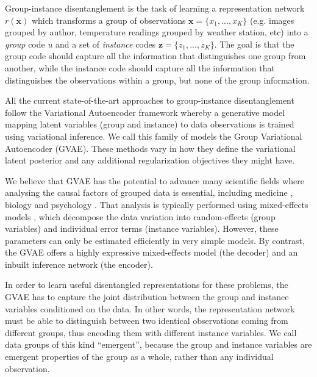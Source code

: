 \documentclass[nohyperref]{article}
\theoremstyle{plain}
\theoremstyle{definition}
\theoremstyle{remark}
\begin{document}
Group-instance disentanglement is the task of learning a representation network $r(\mathbf{x})$ which transforms a group of observations $\mathbf{x} = \{x_1, ..., x_K\}$ (e.g. images grouped by author,  temperature readings grouped by weather station,  etc) into a \textit{group} code $u$ and a set of \textit{instance} codes $\mathbf{z} = \{z_1, ..., z_K\}$. The goal is that the group code should capture all the information that distinguishes one group from another,  while the instance code should capture all the information that distinguishes the observations within a group, but none of the group information.

All the current state-of-the-art approaches to group-instance disentanglement \citep{Bouchacourt2018MultiLevelVA,Hosoya2019GroupbasedLO,Shu2020Weakly, Chen2020WeaklySD,Locatello2020WeaklySupervisedDW} follow the Variational Autoencoder framework \citep{Kingma2014AutoEncodingVB,JimenezRezende2014StochasticBA} whereby a generative model mapping latent variables (group and instance) to data observations is trained using variational inference. We call this family of models the Group Variational Autoencoder (GVAE). These methods vary in how they define the variational latent posterior and any additional regularization objectives they might have.

We believe that GVAE has the potential to advance many scientific fields where analysing the causal factors of grouped data is essential, including medicine \citep{Liang1986LongitudinalDA}, biology \citep{Quinn2002ExperimentalDA} and psychology \citep{Schafer2002MissingDO}. That analysis is typically performed using mixed-effects models \citep{Pinheiro2001MixedEffectsMI}, which decompose the data variation into random-effects (group variables) and individual error terms (instance variables). However, these parameters can only be estimated efficiently in very simple models. By contrast, the GVAE offers a highly expressive mixed-effects model (the decoder) and an inbuilt inference network (the encoder).

In order to learn useful disentangled representations for these problems,  the GVAE has to capture the joint distribution between the group and instance variables conditioned on the data. In other words,  the representation network must be able to distinguish between two identical observations coming from different groups, thus encoding them with different instance variables.  We call data groups of this kind ``emergent'', because the group and instance variables are emergent properties of the group as a whole, rather than any individual observation. 
\end{document}
